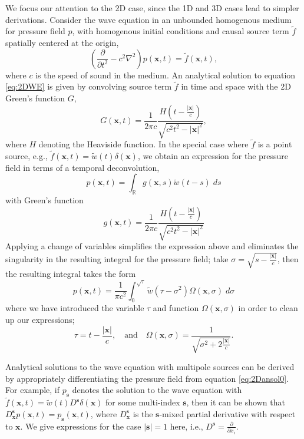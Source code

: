 We focus our attention to the 2D case, since the 1D and 3D cases lead to simpler derivations.
Consider the wave equation in an unbounded homogenous medium for pressure field $p$, with homogenous initial conditions and causal source term $\tilde f$ spatially centered at the origin,
\begin{equation}\label{eq:2DWE}
        \left( \frac{\partial}{\partial t^2} - c^2 \nabla^2 \right) p(\mathbf x,t) = \tilde f(\mathbf x,t),
\end{equation}
where $c$ is the speed of sound in the medium.
An analytical solution to equation \ref{eq:2DWE} is given by convolving source term $\tilde f$ in time and space with the 2D Green's function $G$,
\[
        G(\mathbf x,t) = \frac{1}{2\pi c} \frac{H(t-\tfrac{|\mathbf x|}{c})}{\sqrt{c^2t^2 - |\mathbf x|^2}},
\] 
where $H$ denoting the Heaviside function.
In the special case where $\tilde f$ is a point source, e.g., $\tilde f(\mathbf x,t) = \tilde w(t) \delta(\mathbf x)$, we obtain an expression for the pressure field in terms of a temporal deconvolution,
\[
        p(\mathbf x,t) = \int_{\mathbb R} g(\mathbf x,s) \tilde w(t-s) \; ds
\]
with Green's function
\[
        g(\mathbf x,t) = \frac{1}{2\pi c} \frac{H(t-\tfrac{|\mathbf x|}{c})}{\sqrt{c^2t^2-|\mathbf x|^2}} 
\]
Applying a change of variables simplifies the expression above and eliminates the singularity in the resulting integral for the pressure field;
take $\sigma = \sqrt{s-\tfrac{|\mathbf x|}{c}}$, then the resulting integral takes the form
\begin{equation}\label{eq:2Dansol0}
        p(\mathbf x,t) = \frac{1}{\pi c^2} \int_{0}^{\sqrt{\tau}} \tilde w(\tau-\sigma^2) \Omega(\mathbf x,\sigma) \; d\sigma
\end{equation}
where we have introduced the variable $\tau$ and function $\Omega(\mathbf x,\sigma)$ in order to clean up our expressions;
\[
        \tau = t - \frac{|\mathbf x|}{c}, \quad \text{and} \quad \Omega(\mathbf x,\sigma) = \frac{1}{\sqrt{\sigma^2 + 2 \frac{|\mathbf x|}{c}}}.
\]

Analytical solutions to the wave equation with multipole sources can be derived by appropriately differentiating the pressure field from equation \ref{eq:2Dansol0}.
For example, if $p_{\mathbf s}$ denotes the solution to the wave equation with $\tilde f(\mathbf x,t) = \tilde w(t) D^{\mathbf s} \delta(\mathbf x)$ for some multi-index $\mathbf s$, then it can be shown that $D^{\mathbf s}_{\mathbf x} p(\mathbf x,t) = p_{\mathbf s}(\mathbf x,t)$, where $D^{\mathbf s}_{\mathbf x}$ is the $\mathbf s$-mixed partial derivative with respect to $\mathbf x$.
We give expressions for the case $|\mathbf s|=1$ here, i.e., $D^{\mathbf s} = \tfrac{\partial}{\partial x_i}$. 

